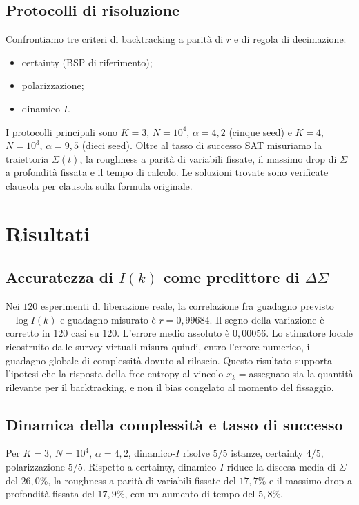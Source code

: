 \documentclass{article}
\newcommand{\Sig}{\Sigma}
\begin{document}
\subsection{Protocolli di risoluzione}

Confrontiamo tre criteri di backtracking a parit\`a di $r$ e di regola di decimazione:
\begin{itemize}
  \item certainty (BSP di riferimento);
  \item polarizzazione;
  \item dinamico-$I$.
\end{itemize}
I protocolli principali sono $K=3$, $N=10^4$, $\alpha=4{,}2$ (cinque seed) e $K=4$, $N=10^3$, $\alpha=9{,}5$ (dieci seed).
Oltre al tasso di successo SAT misuriamo la traiettoria $\Sig(t)$, la roughness a parit\`a di variabili fissate, il massimo drop di $\Sig$ a profondit\`a fissata e il tempo di calcolo.
Le soluzioni trovate sono verificate clausola per clausola sulla formula originale.

\section{Risultati}
\label{sec:results}

\subsection{Accuratezza di $I(k)$ come predittore di $\Delta\Sig$}

Nei $120$ esperimenti di liberazione reale, la correlazione fra guadagno previsto $-\log I(k)$ e guadagno misurato \`e $r=0{,}99684$.
Il segno della variazione \`e corretto in $120$ casi su $120$.
L'errore medio assoluto \`e $0{,}00056$.
Lo stimatore locale ricostruito dalle survey virtuali misura quindi, entro l'errore numerico, il guadagno globale di complessit\`a dovuto al rilascio.
Questo risultato supporta l'ipotesi che la risposta della free entropy al vincolo $x_k=$assegnato sia la quantit\`a rilevante per il backtracking, e non il bias congelato al momento del fissaggio.

\subsection{Dinamica della complessit\`a e tasso di successo}

Per $K=3$, $N=10^4$, $\alpha=4{,}2$, dinamico-$I$ risolve $5/5$ istanze, certainty $4/5$, polarizzazione $5/5$.
Rispetto a certainty, dinamico-$I$ riduce la discesa media di $\Sig$ del $26{,}0\%$, la roughness a parit\`a di variabili fissate del $17{,}7\%$ e il massimo drop a profondit\`a fissata del $17{,}9\%$, con un aumento di tempo del $5{,}8\%$.
\end{document}
